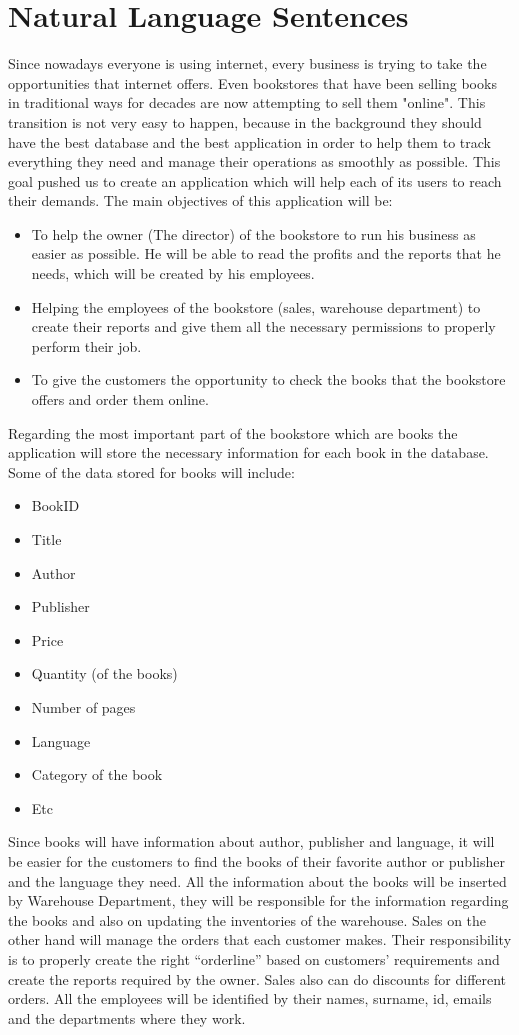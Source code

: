 \section{Natural Language Sentences}

Since nowadays everyone is using internet, every business is trying to take the opportunities that  
internet offers. Even bookstores that have been selling books in traditional ways for decades are now 
attempting to sell them "online". This transition is not very easy to happen, because in the background 
they should have the best database and the best application in order to help them to track everything 
they need and manage their operations as smoothly as possible. This goal pushed us to create an 
application which will help each of its users to reach their demands. The main objectives of this 
application will be:
\begin{itemize}
    \item To help the owner (The director) of the bookstore to run his business as easier as possible. He will be able to read the profits and the reports that he needs, which will be created by his employees.
    \item Helping the employees of the bookstore (sales, warehouse department) to create their reports and give them all the necessary permissions to properly perform their job.
    \item To give the customers the opportunity to check the books that the bookstore offers and order them online. 
\end{itemize}
Regarding the most important part of the bookstore which are books the application will store the necessary information for each book in the database. Some of the data stored for books will include:
\begin{itemize}
\item BookID
\item Title
\item Author
\item Publisher
\item Price
\item Quantity (of the books)
\item Number of pages
\item Language
\item Category of the book
\item Etc
\end{itemize}
Since books will have information about author, publisher and language, it will be easier for the customers to find the books of their favorite author or publisher and the language they need.
 All the information about the books will be inserted by Warehouse Department, they will be responsible for the information regarding the books and also on updating the inventories of the warehouse. Sales on the other hand will manage the orders that each customer makes. Their responsibility is to properly create the right “orderline” based on customers’ requirements and create the reports required by the owner. Sales also can do discounts for different 	orders. All the employees will be identified by their names, surname, id, emails and the departments where they work.

